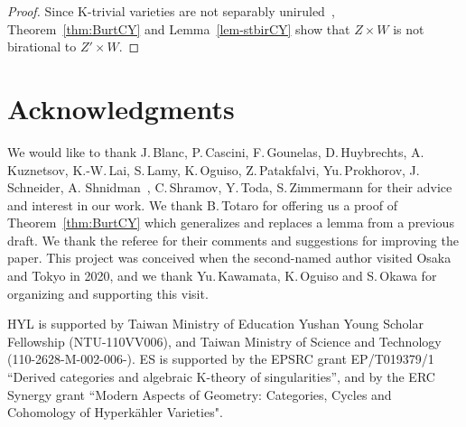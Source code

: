 \documentclass[a4paper,12pt]{amsart}
\theoremstyle{plain}
\numberwithin{equation}{section}
\theoremstyle{definition}
\renewcommand{\(}{\left(}
\renewcommand{\)}{\right)}
\begin{document}
\begin{proof} 

Since K-trivial varieties are not separably uniruled~\cite[Corollary IV.1.11]{Kollarrat}, 
Theorem~\ref{thm:BurtCY}
and Lemma~\ref{lem-stbirCY} show that
$Z \times W$ is not birational to $Z' \times W$.
\end{proof}



\section*{Acknowledgments} 

We would like to thank 
J.\,Blanc,
P.\,Cascini,
F.\,Gounelas,
D.\,Huybrechts,
A.\,Kuznetsov,
\mbox{K.-W.\,Lai,}
S.\,Lamy,
K.\,Oguiso,
Z.\,Patakfalvi,
Yu.\,Prokhorov,
J.\,Schneider,
A. Shnidman~\cite{MO-Shnidman},
C.\,Shramov,
Y.\,Toda,
S.\,Zimmermann 
for their advice and interest in our work.
We thank B.\,Totaro for offering us a proof of Theorem~\ref{thm:BurtCY} which generalizes and replaces a  lemma from a previous draft.
We thank the referee for their comments and suggestions for
improving the paper.
This project was conceived when the second-named
author visited Osaka and Tokyo
in 2020, and we thank Yu.\,Kawamata,
K.\,Oguiso and S.\,Okawa for organizing and supporting this visit.

HYL is supported by
	Taiwan Ministry of Education Yushan Young Scholar Fellowship (NTU-110VV006),
	and Taiwan Ministry of Science and Technology (110-2628-M-002-006-).
	ES is supported by the EPSRC grant
    EP/T019379/1 ``Derived categories and algebraic K-theory of singularities'', and by the
    ERC Synergy grant ``Modern Aspects of Geometry: Categories, Cycles and Cohomology of Hyperkähler Varieties".




\end{document}
